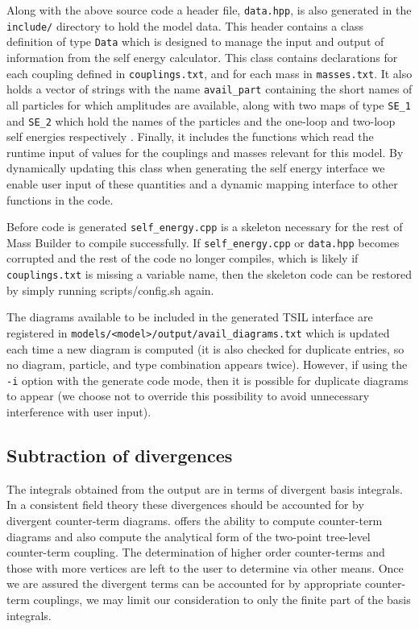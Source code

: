Along with the above source code a header file, \lstinline{data.hpp}, is also generated in the \lstinline{include/} directory to hold the model data.  This header contains a class definition of type \lstinline{Data} which is designed to manage the input and output of information from the self energy calculator.   This class contains declarations for each coupling defined in \lstinline{couplings.txt}, and for each mass in \lstinline{masses.txt}.  It also holds a vector of strings with the name \lstinline{avail_part} containing the short names of all particles for which amplitudes are available, along with two maps of type  \lstinline{SE_1} and \lstinline{SE_2} which hold the names of the particles and the one-loop and two-loop self energies respectively .  Finally, it includes the functions which read the runtime input of values for the couplings and masses relevant for this model.  By dynamically updating this class when generating the self energy interface we enable user input of these quantities and a dynamic mapping interface to other functions in the code.

Before code is generated \lstinline{self_energy.cpp} is a skeleton necessary for the rest of Mass Builder to compile successfully.  If \lstinline{self_energy.cpp} or \lstinline{data.hpp} becomes corrupted and the rest of the code no longer compiles, which is likely if \lstinline{couplings.txt} is missing a variable name, then the skeleton code can be restored by simply running scripts/config.sh again.

The diagrams available to be included in the generated TSIL interface are registered in \lstinline{models/<model>/output/avail_diagrams.txt} which is updated each time a new diagram is computed (it is also checked for duplicate entries, so no diagram, particle, and type combination appears twice).  However, if using the \lstinline{-i} option with the generate code mode, then it is possible for duplicate diagrams to appear (we choose not to override this possibility to avoid unnecessary interference with user input).

\subsection{Subtraction of divergences}

The integrals obtained from the \tarcer output are in terms of divergent basis integrals.  In a consistent field theory these divergences should be accounted for by divergent counter-term diagrams.  \mb offers the ability to compute counter-term diagrams and also compute the analytical form of the two-point tree-level counter-term coupling.  The determination of higher order counter-terms and those with more vertices are left to the user to determine via other means.  Once we are assured the divergent terms can be accounted for by appropriate counter-term couplings, we may limit our consideration to only the finite part of the basis integrals.

